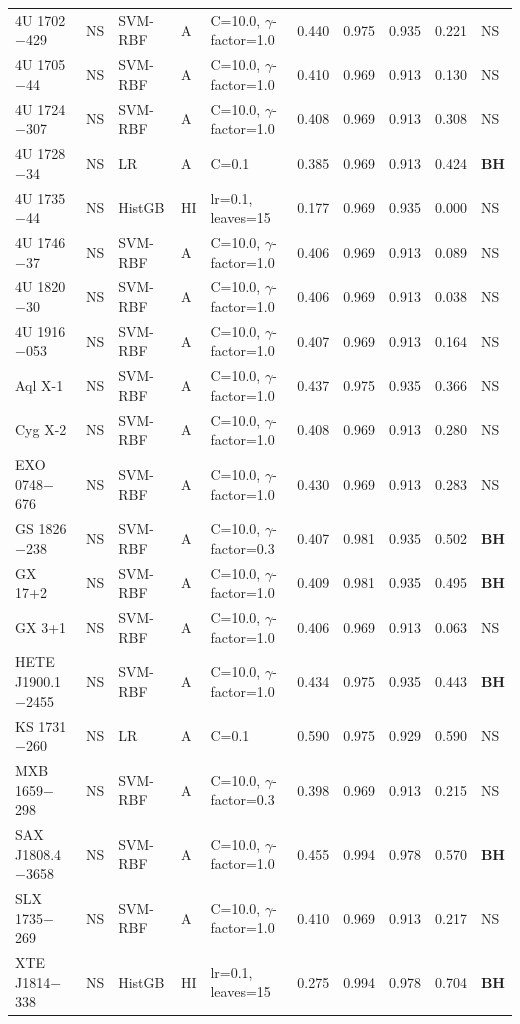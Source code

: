 {\begin{longtable}{@{}llllp{3.6cm}rrrrl@{}}
4U 1702$-$429 & NS & SVM-RBF & A & C=10.0, $\gamma$-factor=1.0 & 0.440 & 0.975 & 0.935 & 0.221 & NS \\
4U 1705$-$44 & NS & SVM-RBF & A & C=10.0, $\gamma$-factor=1.0 & 0.410 & 0.969 & 0.913 & 0.130 & NS \\
4U 1724$-$307 & NS & SVM-RBF & A & C=10.0, $\gamma$-factor=1.0 & 0.408 & 0.969 & 0.913 & 0.308 & NS \\
4U 1728$-$34 & NS & LR & A & C=0.1 & 0.385 & 0.969 & 0.913 & 0.424 & \textbf{BH} \\
4U 1735$-$44 & NS & HistGB & HI & lr=0.1, leaves=15 & 0.177 & 0.969 & 0.935 & 0.000 & NS \\
4U 1746$-$37 & NS & SVM-RBF & A & C=10.0, $\gamma$-factor=1.0 & 0.406 & 0.969 & 0.913 & 0.089 & NS \\
4U 1820$-$30 & NS & SVM-RBF & A & C=10.0, $\gamma$-factor=1.0 & 0.406 & 0.969 & 0.913 & 0.038 & NS \\
4U 1916$-$053 & NS & SVM-RBF & A & C=10.0, $\gamma$-factor=1.0 & 0.407 & 0.969 & 0.913 & 0.164 & NS \\
Aql X-1 & NS & SVM-RBF & A & C=10.0, $\gamma$-factor=1.0 & 0.437 & 0.975 & 0.935 & 0.366 & NS \\
Cyg X-2 & NS & SVM-RBF & A & C=10.0, $\gamma$-factor=1.0 & 0.408 & 0.969 & 0.913 & 0.280 & NS \\
EXO 0748$-$676 & NS & SVM-RBF & A & C=10.0, $\gamma$-factor=1.0 & 0.430 & 0.969 & 0.913 & 0.283 & NS \\
GS 1826$-$238 & NS & SVM-RBF & A & C=10.0, $\gamma$-factor=0.3 & 0.407 & 0.981 & 0.935 & 0.502 & \textbf{BH} \\
GX 17+2 & NS & SVM-RBF & A & C=10.0, $\gamma$-factor=1.0 & 0.409 & 0.981 & 0.935 & 0.495 & \textbf{BH} \\
GX 3+1 & NS & SVM-RBF & A & C=10.0, $\gamma$-factor=1.0 & 0.406 & 0.969 & 0.913 & 0.063 & NS \\
HETE J1900.1$-$2455 & NS & SVM-RBF & A & C=10.0, $\gamma$-factor=1.0 & 0.434 & 0.975 & 0.935 & 0.443 & \textbf{BH} \\
KS 1731$-$260 & NS & LR & A & C=0.1 & 0.590 & 0.975 & 0.929 & 0.590 & NS \\
MXB 1659$-$298 & NS & SVM-RBF & A & C=10.0, $\gamma$-factor=0.3 & 0.398 & 0.969 & 0.913 & 0.215 & NS \\
SAX J1808.4$-$3658 & NS & SVM-RBF & A & C=10.0, $\gamma$-factor=1.0 & 0.455 & 0.994 & 0.978 & 0.570 & \textbf{BH} \\
SLX 1735$-$269 & NS & SVM-RBF & A & C=10.0, $\gamma$-factor=1.0 & 0.410 & 0.969 & 0.913 & 0.217 & NS \\
XTE J1814$-$338 & NS & HistGB & HI & lr=0.1, leaves=15 & 0.275 & 0.994 & 0.978 & 0.704 & \textbf{BH} \\
\end{longtable}}

